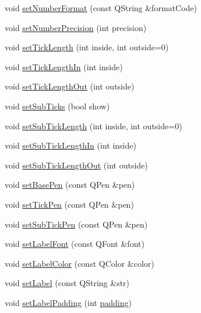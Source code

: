 \begin{DoxyCompactItemize}
\item 
void \mbox{\hyperlink{class_q_c_p_axis_ae585a54dc2aac662e90a2ca82f002590}{set\+Number\+Format}} (const Q\+String \&format\+Code)
\item 
void \mbox{\hyperlink{class_q_c_p_axis_a21dc8023ad7500382ad9574b48137e63}{set\+Number\+Precision}} (int precision)
\item 
void \mbox{\hyperlink{class_q_c_p_axis_a62ec40bebe3540e9c1479a8fd2be3b0d}{set\+Tick\+Length}} (int inside, int outside=0)
\item 
void \mbox{\hyperlink{class_q_c_p_axis_afae1a37a99611366275a51204d991739}{set\+Tick\+Length\+In}} (int inside)
\item 
void \mbox{\hyperlink{class_q_c_p_axis_a3b8a0debd1ffedd2c22d0592dfbb4e62}{set\+Tick\+Length\+Out}} (int outside)
\item 
void \mbox{\hyperlink{class_q_c_p_axis_afa0ce8d4d0015ed23dcde01f8bc30106}{set\+Sub\+Ticks}} (bool show)
\item 
void \mbox{\hyperlink{class_q_c_p_axis_ab702d6fd42fc620607435339a1c2a2e1}{set\+Sub\+Tick\+Length}} (int inside, int outside=0)
\item 
void \mbox{\hyperlink{class_q_c_p_axis_ac46fa2a993a9f5789540977610acf1de}{set\+Sub\+Tick\+Length\+In}} (int inside)
\item 
void \mbox{\hyperlink{class_q_c_p_axis_a4c6dfc3963492ed72a77724012df5f23}{set\+Sub\+Tick\+Length\+Out}} (int outside)
\item 
void \mbox{\hyperlink{class_q_c_p_axis_a778d45fb71b3c7ab3bb7079e18b058e4}{set\+Base\+Pen}} (const Q\+Pen \&pen)
\item 
void \mbox{\hyperlink{class_q_c_p_axis_ad80923bcc1c5da4c4db602c5325e797e}{set\+Tick\+Pen}} (const Q\+Pen \&pen)
\item 
void \mbox{\hyperlink{class_q_c_p_axis_aede4028ae7516bd51a60618a8233f9cf}{set\+Sub\+Tick\+Pen}} (const Q\+Pen \&pen)
\item 
void \mbox{\hyperlink{class_q_c_p_axis_a71ac1a47f7547e490a8c4311d1433cf3}{set\+Label\+Font}} (const Q\+Font \&font)
\item 
void \mbox{\hyperlink{class_q_c_p_axis_a6c906fe56d75f0122335b9f79b999608}{set\+Label\+Color}} (const Q\+Color \&color)
\item 
void \mbox{\hyperlink{class_q_c_p_axis_a33bcc382c111c9f31bb0687352a2dea4}{set\+Label}} (const Q\+String \&str)
\item 
void \mbox{\hyperlink{class_q_c_p_axis_a4391192a766e5d20cfe5cbc17607a7a2}{set\+Label\+Padding}} (int \mbox{\hyperlink{class_q_c_p_axis_a07df379d5c017b8f3a4702532eb037b2}{padding}})

\end{DoxyCompactItemize}
